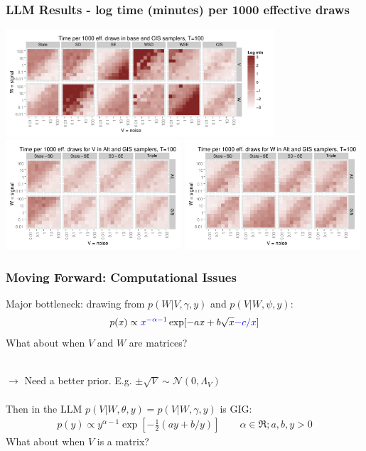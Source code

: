 \documentclass[xcolor=dvipsnames]{beamer}
\newcommand\N{\mathcal{N}}
\begin{document}
\begin{frame}
\frametitle{LLM Results - log time (minutes) per 1000 effective draws}
\centering
\includegraphics[width=0.75\textwidth]{basecistimeplot100}\\
\includegraphics[width=0.49\textwidth]{altgisVtimeplot100}
\includegraphics[width=0.49\textwidth]{altgisWtimeplot100}
\end{frame}

\begin{frame}
\frametitle{Moving Forward: Computational Issues}
Major bottleneck: drawing from $p(W|V,\gamma,y)$ and $p(V|W,\psi,y)$:
\begin{align*}
p(x)\propto {\color{blue}x^{-\alpha-1}}\exp[-ax + b\sqrt{x} {\color{blue}- c/x}] 
\end{align*}
What about when $V$ and $W$ are matrices?\\~

$\to$ Need a better prior. E.g. $\pm \sqrt{V} \sim \N(0,\Lambda_V)$\\~\\

Then in the LLM $p(V|W,\theta,y)=p(V|W,\gamma,y)$ is GIG:
\begin{align*}
p(y) \propto y^{\alpha-1}\exp\left[-\frac{1}{2}(ay + b/y)\right] \qquad \alpha\in\Re; a,b,y>0
\end{align*}
What about when $V$ is a matrix?
\end{frame}
\end{document}

